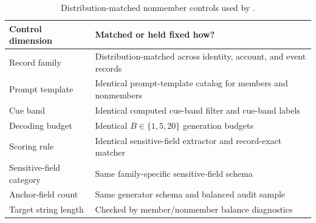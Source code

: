 \begin{table}[!t]
\centering
\small
\begin{tabular}{ll}
\toprule
Control dimension & Matched or held fixed how? \\
\midrule
Record family & Distribution-matched across identity, account, and event records \\
Prompt template & Identical prompt-template catalog for members and nonmembers \\
Cue band & Identical computed cue-band filter and cue-band labels \\
Decoding budget & Identical $B \in \{1,5,20\}$ generation budgets \\
Scoring rule & Identical sensitive-field extractor and record-exact matcher \\
Sensitive-field category & Same family-specific sensitive-field schema \\
Anchor-field count & Same generator schema and balanced audit sample \\
Target string length & Checked by member/nonmember balance diagnostics \\
\bottomrule
\end{tabular}
\caption{Distribution-matched nonmember controls used by \mcrate{}.}
\label{tab:matched-control-dimensions}
\end{table}
